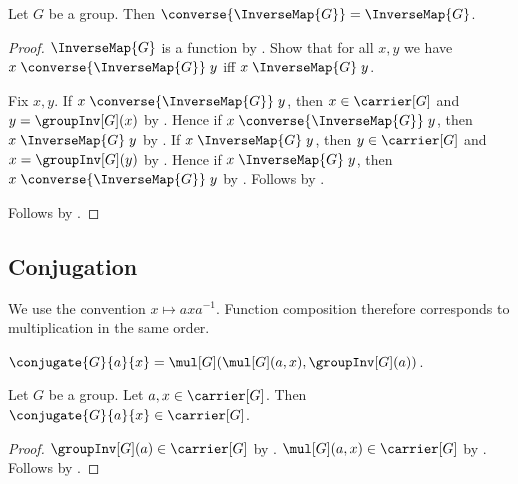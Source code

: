 \begin{lemma}\label{inverse_map_converse}
    Let $G$ be a group.
    Then $\converse{\InverseMap{G}}=\InverseMap{G}$.
\end{lemma}
\begin{proof}
    $\InverseMap{G}$ is a function
        by .
    Show that for all $x,y$ we have
        $x\mathrel{\converse{\InverseMap{G}}}y$ iff
        $x\mathrel{\InverseMap{G}}y$.
    \begin{subproof}
        Fix $x,y$.
        If $x\mathrel{\converse{\InverseMap{G}}}y$, then
            $x\in\carrier[G]$ and $y=\groupInv[G](x)$
            by
            .
        Hence if $x\mathrel{\converse{\InverseMap{G}}}y$, then
            $x\mathrel{\InverseMap{G}}y$ by .
        If $x\mathrel{\InverseMap{G}}y$, then
            $y\in\carrier[G]$ and $x=\groupInv[G](y)$
            by
            .
        Hence if $x\mathrel{\InverseMap{G}}y$, then
            $x\mathrel{\converse{\InverseMap{G}}}y$
            by .
        Follows by \auto.
    \end{subproof}
    Follows by
        .
\end{proof}

\subsection{Conjugation}

We use the convention $x\mapsto axa^{-1}$.  Function composition therefore
corresponds to multiplication in the same order.

\begin{definition}\label{group_conjugate}
    $\conjugate{G}{a}{x}=
        \mul[G](\mul[G](a,x),\groupInv[G](a))$.
\end{definition}

\begin{proposition}\label{group_conjugate_type}
    Let $G$ be a group.
    Let $a,x\in\carrier[G]$.
    Then $\conjugate{G}{a}{x}\in\carrier[G]$.
\end{proposition}
\begin{proof}
    $\groupInv[G](a)\in\carrier[G]$ by
        .
    $\mul[G](a,x)\in\carrier[G]$ by
        .
    Follows by
        .
\end{proof}


